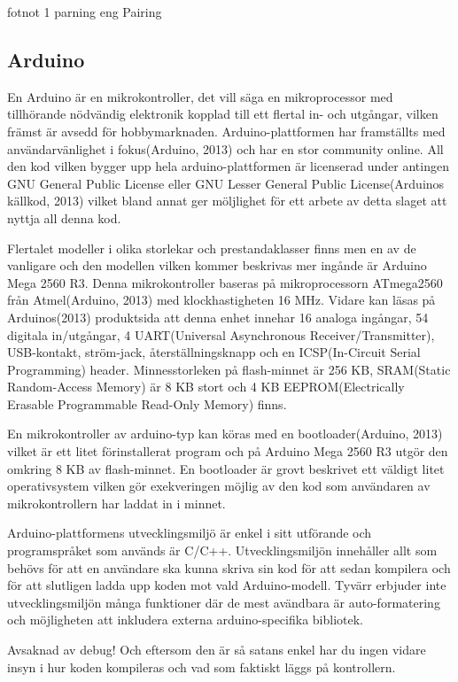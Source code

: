 \documentclass[11pt]{article}
\begin{document}
fotnot 1 parning eng Pairing

\subsection{Arduino}
En Arduino är en mikrokontroller, det vill säga en mikroprocessor med tillhörande nödvändig elektronik kopplad till ett flertal in- och utgångar, vilken främst är avsedd för hobbymarknaden. Arduino-plattformen har framställts med användarvänlighet i fokus(Arduino, 2013) och har en stor community online. All den kod vilken bygger upp hela arduino-plattformen är licenserad under antingen GNU General Public License eller GNU Lesser General Public License(Arduinos källkod, 2013) vilket bland annat ger möljlighet för ett arbete av detta slaget att nyttja all denna kod. 

Flertalet modeller i olika storlekar och prestandaklasser finns men en av de vanligare och den modellen vilken kommer beskrivas mer ingånde är Arduino Mega 2560 R3. Denna mikrokontroller baseras på mikroprocessorn ATmega2560 från Atmel(Arduino, 2013) med klockhastigheten 16 MHz. Vidare kan läsas på Arduinos(2013) produktsida att denna enhet innehar 16 analoga ingångar, 54 digitala in/utgångar, 4 UART(Universal Asynchronous Receiver/Transmitter), USB-kontakt, ström-jack, återställningsknapp och en ICSP(In-Circuit Serial Programming) header. Minnesstorleken på flash-minnet är 256 KB, SRAM(Static Random-Access Memory) är 8 KB stort och 4 KB EEPROM(Electrically Erasable Programmable Read-Only Memory) finns.

En mikrokontroller av arduino-typ kan köras med en bootloader(Arduino, 2013) vilket är ett litet förinstallerat program och på Arduino Mega 2560 R3 utgör den omkring 8 KB av flash-minnet. En bootloader är grovt beskrivet ett väldigt litet operativsystem vilken gör exekveringen möjlig av den kod som användaren av mikrokontrollern har laddat in i minnet. 

Arduino-plattformens utvecklingsmiljö är enkel i sitt utförande och programspråket som används är C/C++.  Utvecklingsmiljön innehåller allt som behövs för att en användare ska kunna skriva sin kod för att sedan kompilera och för att slutligen ladda upp koden mot vald Arduino-modell. Tyvärr erbjuder inte utvecklingsmiljön många funktioner där de mest avändbara är auto-formatering och möjligheten att inkludera externa arduino-specifika bibliotek. 

Avsaknad av debug! Och eftersom den är så satans enkel har du ingen vidare insyn i hur koden kompileras och vad som faktiskt läggs på kontrollern.
\end{document}
